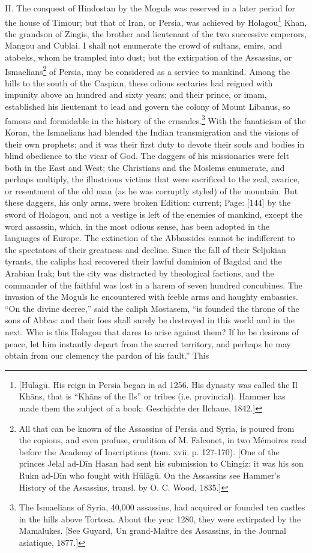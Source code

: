 II. The conquest of Hindostan by the Moguls was reserved in a later period for the house of Timour; but that of Iran, or Persia, was achieved by Holagou\footnote{[Hūlāgū. His reign in Persia began in ad 1256. His dynasty was called the Il Khāns, that is \texthebrew{“}Khāns of the Ils\texthebrew{}” or tribes (i.e. provincial). Hammer has made them the subject of a book: Geschichte der Ilchane, 1842.]} Khan, the grandson of Zingis, the brother and lieutenant of the two successive emperors, Mangou and Cublai. I shall not enumerate the crowd of sultans, emirs, and atabeks, whom he trampled into dust; but the extirpation of the Assassins, or Ismaelians\footnote{All that can be known of the Assassins of Persia and Syria, is poured from the copious, and even profuse, erudition of M. Falconet, in two Mémoires read before the Academy of Inscriptions (tom. xvii. p. 127-170). [One of the princes Jelal ad-Dīn Hasan had sent his submission to Chingiz: it was his son Rukn ad-Dīn who fought with Hūlāgū. On the Assassins see Hammer\texthebrew{}’s History of the Assassins, transl. by O. C. Wood, 1835.]} of Persia, may be considered as a service to mankind. Among the hills to the south of the Caspian, these odious sectaries had reigned with impunity above an hundred and sixty years; and their prince, or imam, established his lieutenant to lead and govern the colony of Mount Libanus, so famous and formidable in the history of the crusades.\footnote{The Ismaelians of Syria, 40,000 assassins, had acquired or founded ten castles in the hills above Tortosa. About the year 1280, they were extirpated by the Mamalukes. [See Guyard, Un grand-Maître des Assassins, in the Journal asiatique, 1877.]} With the fanaticism of the Koran, the Ismaelians had blended the Indian transmigration and the visions of their own prophets; and it was their first duty to devote their souls and bodies in blind obedience to the vicar of God. The daggers of his missionaries were felt both in the East and West; the Christians and the Moslems enumerate, and perhaps multiply, the illustrious victims that were sacrificed to the zeal, avarice, or resentment of the old man (as he was corruptly styled) of the mountain. But these daggers, his only arms, were broken Edition: current; Page: [144] by the sword of Holagou, and not a vestige is left of the enemies of mankind, except the word assassin, which, in the most odious sense, has been adopted in the languages of Europe. The extinction of the Abbassides cannot be indifferent to the spectators of their greatness and decline. Since the fall of their Seljukian tyrants, the caliphs had recovered their lawful dominion of Bagdad and the Arabian Irak; but the city was distracted by theological factions, and the commander of the faithful was lost in a harem of seven hundred concubines. The invasion of the Moguls he encountered with feeble arms and haughty embassies. \texthebrew{“}On the divine decree,\texthebrew{}” said the caliph Mostasem, \texthebrew{“}is founded the throne of the sons of Abbas: and their foes shall surely be destroyed in this world and in the next. Who is this Holagou that dares to arise against them? If he be desirous of peace, let him instantly depart from the sacred territory, and perhaps he may obtain from our clemency the pardon of his fault.\texthebrew{}” This 